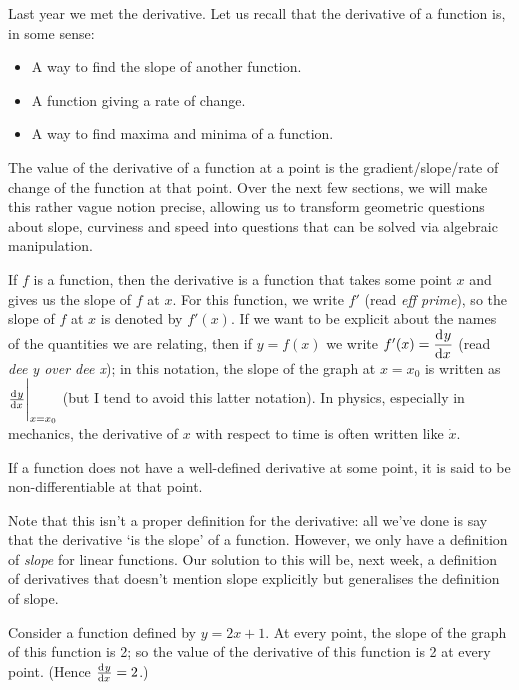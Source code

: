 





Last year we met the derivative. Let us recall that the derivative of a function is, in some sense:
\begin{itemize}
  \item A way to find the slope of another function.
  \item A function giving a rate of change.
  \item A way to find maxima and minima of a function.
\end{itemize}
The value of the derivative of a function at a point is the gradient/slope/rate of change of the function at that
point. Over the next few sections, we will make this rather vague notion precise, allowing us to transform geometric questions
about slope, curviness and speed into questions that can be solved via algebraic manipulation.

If $ f $ is a function, then the derivative is a function that takes some point $ x $ and gives us the slope of $ f $ at $ x $. For this
function, we write $ f' $ (read \emph{eff prime}), so the slope of $ f $ at $ x $ is denoted by $ f'(x) $. If we want to be explicit about the names
of the quantities we are relating, then if $ y = f(x) $ we write $ f'(x) = \dod{y}{x} $ (read \emph{dee y over dee x}); in this notation,
the slope of the graph at $ x = x_0 $ is written as $ \eval{\od{y}{x}}_{x = x_0} $ (but I tend to avoid this latter notation). In physics,
especially in mechanics, the derivative of $ x $ with respect to time is often written like $ \dot x $.

If a function does not have a well-defined derivative at some point, it is said to be non-differentiable at that point.

\begin{rem}
  Note that this isn't a proper definition for the derivative: all we've done is say that the derivative `is the slope' of a function. However,
  we only have a definition of \emph{slope} for linear functions. Our solution to this will be, next week, a definition of derivatives that doesn't
  mention slope explicitly but generalises the definition of slope.
\end{rem}

\begin{ex}
  Consider a function defined by $ y = 2x + 1 $. At every point, the slope of the graph of this function is 2; so
  the value of the derivative of this function is 2 at every point. (Hence $ \od{y}{x} = 2 $.)
\end{ex}

